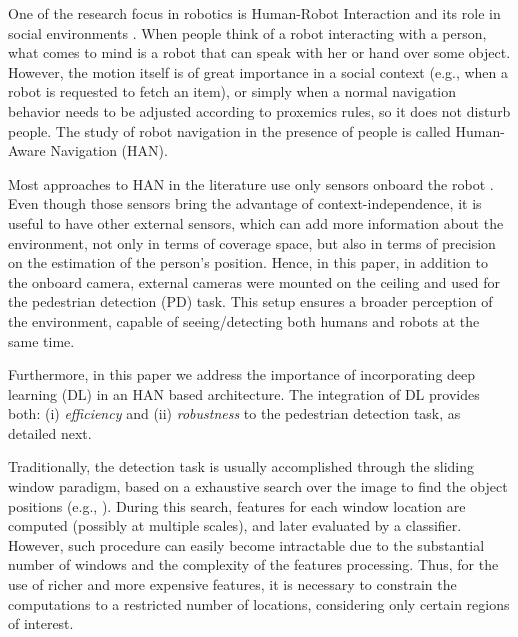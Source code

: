 \documentclass[5p,time]{elsarticle}
\begin{document}
One of the research focus in robotics is Human-Robot Interaction and its role in social environments \cite{article:kruse:2013}. When people
think of a robot interacting with a person, what comes to mind is a
robot that can speak with her or hand over some object. However, the
motion itself is of great importance in a social context (e.g., when
a robot is requested to fetch an item), or simply when a normal
navigation behavior needs to be adjusted according to proxemics
rules, so it does not disturb people. The study of robot navigation
in the presence of people is called Human-Aware Navigation (HAN).

Most approaches to HAN in the literature use only sensors onboard
the robot \cite{article:Sisbot:2006, 34,21,article:pandey:2010}. Even though those sensors bring the advantage of
context-independence, it is useful to have other external sensors,
which can add more information about the environment, not only in
terms of coverage space, but also in terms of precision on the
estimation of the person's position. Hence, in this paper, in
addition to the onboard camera, external cameras were mounted on
the ceiling and used for the pedestrian detection (PD) task. This
setup ensures a broader perception of the environment, capable of
seeing/detecting both humans and robots at the same time.

Furthermore, in this paper we address the importance of
incorporating deep learning (DL) in an HAN based architecture. The
integration of DL provides both: (i) {\em efficiency} and (ii) {\em
	robustness} to the pedestrian detection task, as detailed next.

Traditionally, the detection task is usually accomplished through
the sliding window paradigm, based on a exhaustive search over the
image to find the object positions (e.g.,
\cite{DalalCVPR2005,FelzenszwalbPAMI2010,ViolaIJCV2004,ZhuCVPR2010}).
During this search, features for each window location are computed (possibly at multiple scales), and later evaluated by a
classifier. However, such procedure can easily become intractable
due to the substantial number of windows and the complexity of the
features processing. Thus, for the use of richer and more expensive
features, it is necessary to constrain the computations to a
restricted number of locations, considering only certain regions of
interest.
\end{document}
